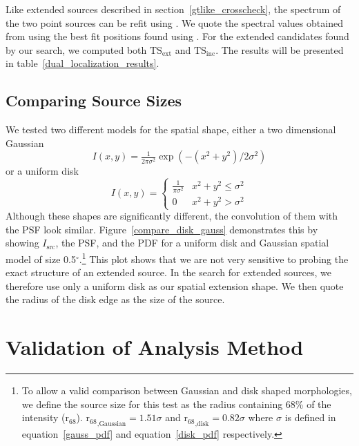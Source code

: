 \documentclass[12pt,preprint]{aastex}
\newcommand{\tsext}{{\ensuremath{\text{TS}_{\text{ext}}}}\xspace}
\newcommand{\tsinc}{\ensuremath{\text{TS}_{\text{inc}}}\xspace}
\newcommand{\rsixeight}{{\ensuremath{\text{r}_{68}}}\xspace}
\renewcommand{\deg}{\ensuremath{^\circ}\xspace}
\newcommand{\pointlike}{\text{\em pointlike}\xspace}
\newcommand{\gtlike}{\text{\em gtlike}\xspace}
\begin{document}
Like extended sources described in section~\ref{gtlike_crosscheck},
the spectrum of the two point sources can be refit using \gtlike.
We quote the spectral values obtained from \gtlike using the best fit
positions found using \pointlike.  For the extended candidates found
by our search, we computed both \tsext and \tsinc.  The results will be
presented in table~\ref{dual_localization_results}.

\subsection{Comparing Source Sizes}

\label{compare_source_size}

We tested two different models for the
spatial shape, either a two dimensional Gaussian
\begin{equation}\label{gauss_pdf}
  I(x,y)=\tfrac{1}{2\pi\sigma^2}\exp\left(-(x^2+y^2)/2\sigma^2\right)
\end{equation}
or a uniform disk
\begin{equation}\label{disk_pdf}
  I(x,y)=
  \begin{cases}
    \frac{1}{\pi\sigma^2} & x^2+y^2\le\sigma^2 \\
    0                      & x^2+y^2>\sigma^2
  \end{cases}
\end{equation}
Although these shapes are significantly different, the convolution
of them with the PSF look similar.  Figure~\ref{compare_disk_gauss}
demonstrates this by showing $I_\text{src}$, the PSF, and the PDF for
a uniform disk and Gaussian spatial model of size 0.5\deg.\footnote{To
allow a valid comparison between Gaussian and disk shaped morphologies,
we define the source size for this test as the radius containing
68\% of the intensity ($\rsixeight$).  $\rsixeight_\text{,Gaussian}=1.51\sigma$
and $\rsixeight_\text{,disk}=0.82\sigma$ where $\sigma$
is defined in equation~\ref{gauss_pdf} and
equation~\ref{disk_pdf} respectively.} This plot shows that we are
not very sensitive to probing the exact structure of an extended source.
In the search for extended sources, we therefore use only a uniform
disk as our spatial extension shape. We then quote the radius of the
disk edge as the size of the source.

\section{Validation of Analysis Method}
\end{document}
